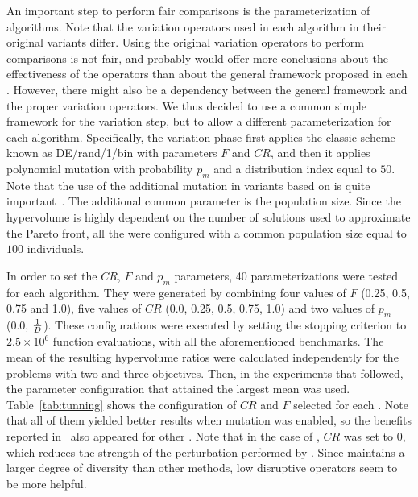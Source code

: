 An important step to perform fair comparisons is the parameterization of algorithms.
%
Note that the variation operators used in each algorithm in their original variants differ.
%
Using the original variation operators to perform comparisons is not fair, and probably would offer more conclusions 
about the effectiveness of the operators than about the general framework proposed in each \MOEA{}.
%
However, there might also be a dependency between the general framework and the proper variation operators.
%
We thus decided to use a common simple framework for the variation step, but to allow a different parameterization
for each algorithm.
%
Specifically, the variation phase first applies the classic \DE{} scheme known as DE/rand/1/bin with parameters $F$
and $CR$, and then it applies polynomial mutation with probability $p_m$
and a distribution index equal to $50$.
%
Note that the use of the additional mutation in variants based on \MOEAD{} is quite important~\cite{zhang2009performance}.
%
The additional common parameter is the population size.
%
Since the hypervolume is highly dependent on the number of solutions used to approximate the Pareto front,
all the \MOEAS{} were configured with a common population size equal to $100$ individuals.

In order to set the $CR$, $F$ and $p_m$ parameters, 40 parameterizations were tested for each algorithm.
%
They were generated by combining four values of $F$ (0.25, 0.5, 0.75 and 1.0), five values of $CR$ (0.0, 0.25, 0.5, 0.75, 1.0) 
and two values of $p_m$ (0.0, $1\over{D}$).
%
These configurations were executed by setting the stopping criterion to $2.5 \times 10^{6}$ function evaluations, 
with all the aforementioned benchmarks.
%
The mean of the resulting hypervolume ratios were calculated independently for the problems with two and three objectives.
%
Then, in the experiments that followed, the parameter configuration that attained the largest mean was used.
%
Table~\ref{tab:tunning} shows the configuration of $CR$ and $F$ selected for each \MOEA{}.
%
Note that all of them yielded better results when mutation was enabled, so the benefits reported in~\cite{zhang2009performance}
also appeared for other \MOEAS{}.
%
Note that in the case of \AVSDMOEAD{}, $CR$ was set to 0, which reduces the strength of the perturbation performed
by \DE{}.
%
Since \AVSDMOEAD{} maintains a larger degree of diversity than other methods, low disruptive
operators seem to be more helpful.

